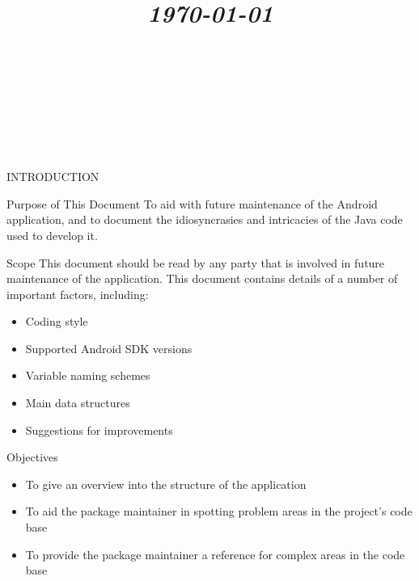 \documentclass{article}
\title{
	\vspace{1.2in}
	\textmd{\textbf{\doctitle}} \\
	\vspace{0.1in}\large{\textit{\today}} \\
	\vspace{0.4in}
	{\bf{\qanumber}} \\ \vspace{0.4in}
	\version \\
	\status \\
	\vspace{0.4in}
}
\author{\authors}
\date{}
\begin{document}
	\maketitle
	\newpage
	\tableofcontents
	\newpage

	\begin{section}{INTRODUCTION}
		\begin{subsection}{Purpose of This Document}
			To aid with future maintenance of the Android application, and to document the idiosyncrasies and intricacies of the Java code used to develop it.
		\end{subsection}
	
		\begin{subsection}{Scope}
			This document should be read by any party that is involved in future maintenance of the application. This document contains details of a number of important factors, including:
			
			\begin{itemize}
				\item{Coding style}
				\item{Supported Android SDK versions}
				\item{Variable naming schemes}
				\item{Main data structures}
				\item{Suggestions for improvements}
			\end{itemize}
		\end{subsection}
		
		\begin{subsection}{Objectives}
			\begin{itemize}
				\item{To give an overview into the structure of the application}
				\item{To aid the package maintainer in spotting problem areas in the project's code base}
				\item{To provide the package maintainer a reference for complex areas in the code base}
			\end{itemize}
		\end{subsection}
	\end{section}
	
\end{document}
